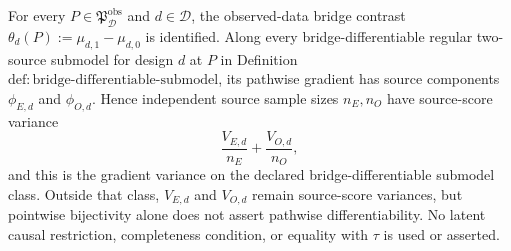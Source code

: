 For every \(P\in\mathfrak P_{\mathcal D}^{\mathrm{obs}}\) and \(d\in\mathcal D\), the observed-data bridge contrast \(\theta_d(P):=\mu_{d,1}-\mu_{d,0}\) is identified. Along every bridge-differentiable regular two-source submodel for design \(d\) at \(P\) in Definition~\(\mathrm{def{:}bridge\text{-}differentiable\text{-}submodel}\), its pathwise gradient has source components \(\phi_{E,d}\) and \(\phi_{O,d}\). Hence independent source sample sizes \(n_E,n_O\) have source-score variance
\[
 \frac{V_{E,d}}{n_E}+\frac{V_{O,d}}{n_O},
\]
and this is the gradient variance on the declared bridge-differentiable submodel class. Outside that class, \(V_{E,d}\) and \(V_{O,d}\) remain source-score variances, but pointwise bijectivity alone does not assert pathwise differentiability. No latent causal restriction, completeness condition, or equality with \(\tau\) is used or asserted.